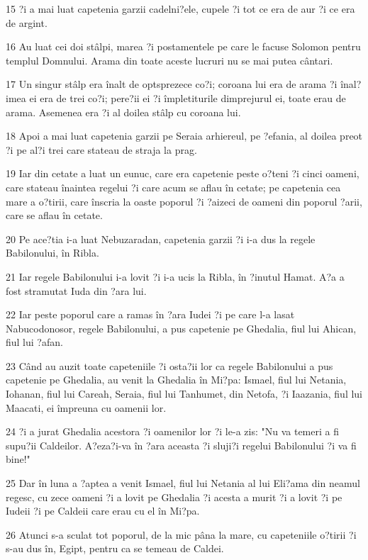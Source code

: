 \par 15 ?i a mai luat capetenia garzii cadelni?ele, cupele ?i tot ce era de aur ?i ce era de argint.
\par 16 Au luat cei doi stâlpi, marea ?i postamentele pe care le facuse Solomon pentru templul Domnului. Arama din toate aceste lucruri nu se mai putea cântari.
\par 17 Un singur stâlp era înalt de optsprezece co?i; coroana lui era de arama ?i înal?imea ei era de trei co?i; pere?ii ei ?i împletiturile dimprejurul ei, toate erau de arama. Asemenea era ?i al doilea stâlp cu coroana lui.
\par 18 Apoi a mai luat capetenia garzii pe Seraia arhiereul, pe ?efania, al doilea preot ?i pe al?i trei care stateau de straja la prag.
\par 19 Iar din cetate a luat un eunuc, care era capetenie peste o?teni ?i cinci oameni, care stateau înaintea regelui ?i care acum se aflau în cetate; pe capetenia cea mare a o?tirii, care înscria la oaste poporul ?i ?aizeci de oameni din poporul ?arii, care se aflau în cetate.
\par 20 Pe ace?tia i-a luat Nebuzaradan, capetenia garzii ?i i-a dus la regele Babilonului, în Ribla.
\par 21 Iar regele Babilonului i-a lovit ?i i-a ucis la Ribla, în ?inutul Hamat. A?a a fost stramutat Iuda din ?ara lui.
\par 22 Iar peste poporul care a ramas în ?ara Iudei ?i pe care l-a lasat Nabucodonosor, regele Babilonului, a pus capetenie pe Ghedalia, fiul lui Ahican, fiul lui ?afan.
\par 23 Când au auzit toate capeteniile ?i osta?ii lor ca regele Babilonului a pus capetenie pe Ghedalia, au venit la Ghedalia în Mi?pa: Ismael, fiul lui Netania, Iohanan, fiul lui Careah, Seraia, fiul lui Tanhumet, din Netofa, ?i Iaazania, fiul lui Maacati, ei împreuna cu oamenii lor.
\par 24 ?i a jurat Ghedalia acestora ?i oamenilor lor ?i le-a zis: "Nu va temeri a fi supu?ii Caldeilor. A?eza?i-va în ?ara aceasta ?i sluji?i regelui Babilonului ?i va fi bine!"
\par 25 Dar în luna a ?aptea a venit Ismael, fiul lui Netania al lui Eli?ama din neamul regesc, cu zece oameni ?i a lovit pe Ghedalia ?i acesta a murit ?i a lovit ?i pe Iudeii ?i pe Caldeii care erau cu el în Mi?pa.
\par 26 Atunci s-a sculat tot poporul, de la mic pâna la mare, cu capeteniile o?tirii ?i s-au dus în, Egipt, pentru ca se temeau de Caldei.
